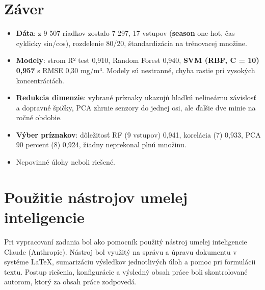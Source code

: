 \documentclass[11pt,a4paper]{article}
\begin{document}
\section*{Záver}
\begin{itemize}[nosep]
  \item \textbf{Dáta}: z 9 507 riadkov zostalo 7 297, 17 vstupov (\textbf{season} one-hot, čas cyklicky sin/cos),
  rozdelenie 80/20, štandardizácia na trénovacej množine.
  \item \textbf{Modely}: strom R² test 0,910, Random Forest 0,940, \textbf{SVM (RBF, C = 10) 0,957} s RMSE
  0,30 mg/m³. Modely sú nestranné, chyba rastie pri vysokých koncentráciách.
  \item \textbf{Redukcia dimenzie}: vybrané príznaky ukazujú hladkú nelineárnu závislosť a dopravné špičky,
  PCA zhrnie senzory do jednej osi, ale ďalšie dve minie na ročné obdobie.
  \item \textbf{Výber príznakov}: dôležitosť RF (9 vstupov) 0,941, korelácia (7) 0,933, PCA 90 percent (8) 0,924,
  žiadny neprekonal plnú množinu.
  \item Nepovinné úlohy neboli riešené.
\end{itemize}

\section*{Použitie nástrojov umelej inteligencie}
Pri vypracovaní zadania bol ako pomocník použitý nástroj umelej inteligencie Claude (Anthropic). Nástroj bol
využitý na správu a úpravu dokumentu v systéme \LaTeX{}, sumarizáciu výsledkov jednotlivých úloh a pomoc pri
formulácii textu. Postup riešenia, konfigurácie a výsledný obsah práce boli skontrolované autorom, ktorý za
obsah práce zodpovedá.
\end{document}
